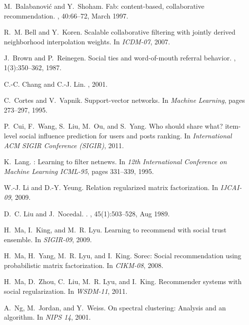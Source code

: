 \documentclass{www2012-accepted}
\begin{document}
\begin{thebibliography}{10}

M.~Balabanovi\'{c} and Y.~Shoham.
\newblock Fab: content-based, collaborative recommendation.
, 40:66--72, March 1997.

R.~M. Bell and Y.~Koren.
\newblock Scalable collaborative filtering with jointly derived neighborhood
  interpolation weights.
\newblock In {\em ICDM-07}, 2007.

J.~Brown and P.~Reinegen.
\newblock Social ties and word-of-mouth referral behavior.
, 1(3):350--362, 1987.

C.-C. Chang and C.-J. Lin.
, 2001.

C.~Cortes and V.~Vapnik.
\newblock Support-vector networks.
\newblock In {\em Machine Learning}, pages 273--297, 1995.

P.~Cui, F.~Wang, S.~Liu, M.~Ou, and S.~Yang.
\newblock Who should share what? item-level social influence prediction for
  users and posts ranking.
\newblock In {\em International ACM SIGIR Conference (SIGIR)}, 2011.

K.~Lang.
: Learning to filter netnews.
\newblock In {\em 12th International Conference on Machine Learning {ICML-95}},
  pages 331--339, 1995.

W.-J. Li and D.-Y. Yeung.
\newblock Relation regularized matrix factorization.
\newblock In {\em IJCAI-09}, 2009.

D.~C. Liu and J.~Nocedal.
.
, 45(1):503--528, Aug 1989.

H.~Ma, I.~King, and M.~R. Lyu.
\newblock Learning to recommend with social trust ensemble.
\newblock In {\em SIGIR-09}, 2009.

H.~Ma, H.~Yang, M.~R. Lyu, and I.~King.
\newblock Sorec: Social recommendation using probabilistic matrix
  factorization.
\newblock In {\em CIKM-08}, 2008.

H.~Ma, D.~Zhou, C.~Liu, M.~R. Lyu, and I.~King.
\newblock Recommender systems with social regularization.
\newblock In {\em WSDM-11}, 2011.

A.~Ng, M.~Jordan, and Y.~Weiss.
\newblock On spectral clustering: Analysis and an algorithm.
\newblock In {\em {NIPS} 14}, 2001.


\end{thebibliography}
\end{document}
